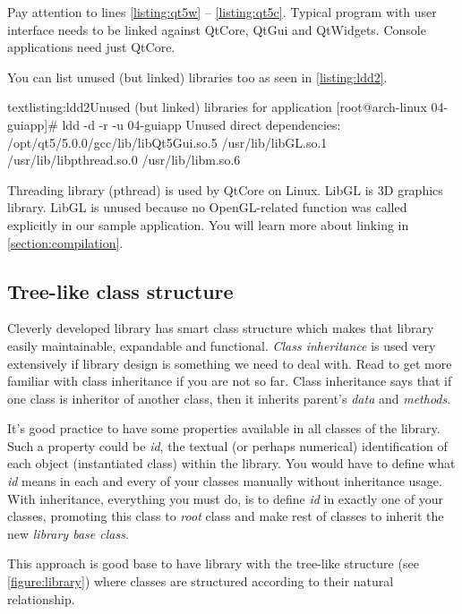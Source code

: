 Pay attention to lines \ref{listing:qt5w} -- \ref{listing:qt5c}. Typical program with user interface needs to be linked against QtCore, QtGui and QtWidgets. Console applications need just QtCore.

You can list unused (but linked) libraries too as seen in \autoref{listing:ldd2}.

\begin{fdoccode}{text}{listing:ldd2}{Unused (but linked) libraries for  application}
[root@arch-linux 04-guiapp]# ldd -d -r -u 04-guiapp
Unused direct dependencies:
/opt/qt5/5.0.0/gcc/lib/libQt5Gui.so.5
/usr/lib/libGL.so.1
/usr/lib/libpthread.so.0
/usr/lib/libm.so.6
\end{fdoccode}

Threading library (pthread) is used by QtCore on Linux. LibGL is 3D graphics library. LibGL is unused because no OpenGL-related function was called explicitly in our sample application. You will learn more about linking in \autoref{section:compilation}.

\subsection{Tree-like class structure}
Cleverly developed library has smart class structure which makes that library easily maintainable, expandable and functional. \textit{Class inheritance} is used very extensively if library design is something we need to deal with. Read \citep[p.~708-783]{prata:cprimer} to get more familiar with \cpp class inheritance if you are not so far. Class inheritance says that if one class is inheritor of another class, then it inherits parent's \textit{data} and \textit{methods}.

It's good practice to have some properties available in all classes of the library. Such a property could be \eg \textit{id}, the textual (or perhaps numerical) identification of each object (instantiated class) within the library. You would have to define what \textit{id} means in each and every of your classes manually without inheritance usage. With inheritance, everything you must do, is to define \textit{id} in exactly one of your classes, promoting this class to \textit{root} class and make rest of classes to inherit the new \textit{library base class}.

This approach is good base to have library with the tree-like structure (see \autoref{figure:library}) where classes are structured according to their natural relationship.

